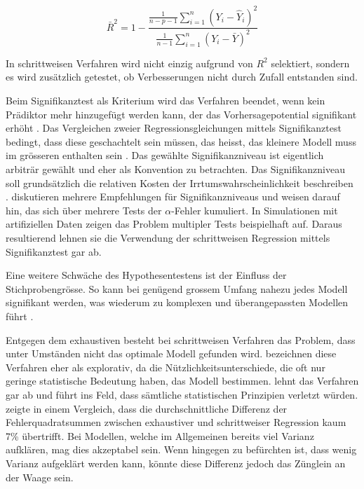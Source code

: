 \begin{equation}
\bar R^2=1-\frac{\displaystyle \frac{1}{n-p-1} \sum_{i=1}^n (Y_i-\hat{Y}_i)^2}{\displaystyle \frac{1}{n-1} \sum_{i=1}^n (Y_i-\bar{Y})^2}
\tag{korrigiertes Bestimmtheitsmass}
\end{equation}

In schrittweisen Verfahren wird nicht einzig aufgrund von $R^2$ selektiert, sondern es wird zusätzlich getestet, ob Verbesserungen nicht durch Zufall entstanden sind. 

Beim Signifikanztest als Kriterium wird das Verfahren beendet, wenn kein Prädiktor mehr hinzugefügt werden kann, der das Vorhersagepotential signifikant erhöht \cite[p.48]{bendel1977comparison}. 
Das Vergleichen zweier Regressionsgleichungen mittels Signifikanztest bedingt, dass diese geschachtelt sein müssen, das heisst, das kleinere Modell muss im grösseren enthalten sein \cite[p. 508]{jacob2003applied}.
Das gewählte Signifikanzniveau ist eigentlich arbiträr gewählt und eher als Konvention zu betrachten. Das Signifikanzniveau soll grundsätzlich die relativen Kosten der Irrtumswahrscheinlichkeit beschreiben \cite[p. 196]{hansen1999discussion}.  diskutieren mehrere Empfehlungen für Signifikanzniveaus und weisen darauf hin, das sich über mehrere Tests der $\alpha$-Fehler kumuliert. 
In  Simulationen mit artifiziellen Daten zeigen  das  Problem multipler Tests beispielhaft auf. 
Daraus resultierend lehnen sie die Verwendung der schrittweisen Regression mittels Signifikanztest gar ab.

Eine weitere Schwäche des Hypothesentestens ist der Einfluss der Stichprobengrösse. So kann bei genügend grossem Umfang nahezu jedes Modell  signifikant werden, was wiederum zu komplexen und überangepassten Modellen führt \cite[p.173]{weakliem2004introduction}.

Entgegen dem exhaustiven besteht bei schrittweisen Verfahren das Problem, dass unter Umständen nicht das optimale Modell gefunden wird. 
 bezeichnen diese Verfahren eher als explorativ, da die Nützlichkeitsunterschiede, die oft nur geringe statistische Bedeutung haben, das Modell bestimmen.
 lehnt das Verfahren gar ab und führt ins Feld, dass sämtliche statistischen Prinzipien verletzt würden. 
 zeigte in einem Vergleich, dass die durchschnittliche Differenz der Fehlerquadratsummen zwischen exhaustiver und schrittweiser Regression kaum 7\% übertrifft. Bei Modellen, welche im Allgemeinen bereits viel Varianz aufklären, mag dies akzeptabel sein. Wenn hingegen zu befürchten ist, dass wenig Varianz aufgeklärt werden kann, könnte diese Differenz jedoch das Zünglein an der Waage sein.